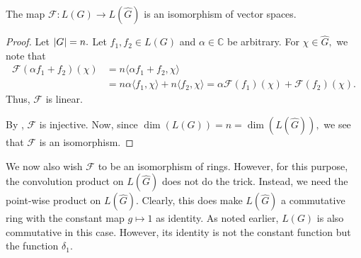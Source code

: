 \begin{prop} \label{prop:fourierisovspace}
    The map $\mathcal{F} : L(G) \to L(\widehat{G})$ is an isomorphism of vector spaces.
\end{prop}
\begin{proof}
    Let ${\left\lvert G \right\lvert} = n.$ Let $f_1, f_2 \in L(G)$ and $\alpha \in \mathbb{C}$ be arbitrary. For $\chi \in \widehat{G},$ we note that
    \begin{align*}
        \mathcal{F}(\alpha f_1 + f_2)(\chi) &= n\langle \alpha f_1 + f_2, \chi\rangle \\
        &= n\alpha\langle f_1, \chi\rangle + n\langle f_2, \chi\rangle = \alpha\mathcal{F}(f_1)(\chi) + \mathcal{F}(f_2)(\chi).
    \end{align*}
    Thus, $\mathcal{F}$ is linear.
    
    By , $\mathcal{F}$ is injective. Now, since $\dim(L(G)) = n = \dim(L(\widehat{G})),$ we see that $\mathcal{F}$ is an isomorphism.
\end{proof}

We now also wish $\mathcal{F}$ to be an isomorphism of rings. However, for this purpose, the convolution product on $L(\widehat{G})$ does not do the trick. Instead, we need the point-wise product on $L(\widehat{G}).$ Clearly, this does make $L(\widehat{G})$ a commutative ring with the constant map $g \mapsto 1$ as identity. As noted earlier, $L(G)$ is also commutative in this case. However, its identity is not the constant function but the function $\delta_1.$

